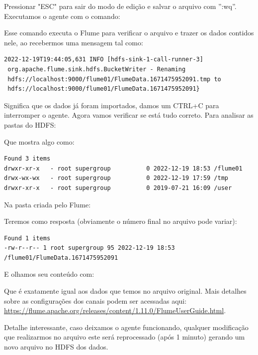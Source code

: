 \documentclass[a4paper,11pt]{article}
\begin{document}
Pressionar "ESC" para sair do modo de edição e salvar o arquivo com ”:wq”. Executamos o agente com o comando: \\

Esse comando executa o Flume para verificar o arquivo e trazer os dados contidos nele, ao recebermos uma mensagem tal como: \vspace{-1em}
\begin{verbatim}
2022-12-19T19:44:05,631 INFO [hdfs-sink-1-call-runner-3]
 org.apache.flume.sink.hdfs.BucketWriter - Renaming
 hdfs://localhost:9000/flume01/FlumeData.1671475952091.tmp to
 hdfs://localhost:9000/flume01/FlumeData.1671475952091}
\end{verbatim} \vspace{-1em}

Significa que os dados já foram importados, damos um CTRL+C para interromper o agente. Agora vamos verificar se está tudo correto. Para analisar as pastas do HDFS: \\

Que mostra algo como: \vspace{-1em}
\begin{verbatim}
Found 3 items
drwxr-xr-x   - root supergroup          0 2022-12-19 18:53 /flume01
drwx-wx-wx   - root supergroup          0 2022-12-19 17:59 /tmp
drwxr-xr-x   - root supergroup          0 2019-07-21 16:09 /user
\end{verbatim}

Na pasta criada pelo Flume: \\

Teremos como resposta (obviamente o número final no arquivo pode variar): \vspace{-1em}
\begin{verbatim}
Found 1 items
-rw-r--r-- 1 root supergroup 95 2022-12-19 18:53 /flume01/FlumeData.1671475952091
\end{verbatim}

E olhamos seu conteúdo com: \\

Que é exatamente igual aos dados que temos no arquivo original. Mais detalhes sobre as configurações dos canais podem ser acessadas aqui: \url{	https://flume.apache.org/releases/content/1.11.0/FlumeUserGuide.html}. 

Detalhe interessante, caso deixamos o agente funcionando, qualquer modificação que realizarmos no arquivo este será reprocessado (após 1 minuto) gerando um novo arquivo no HDFS dos dados.
\end{document}

